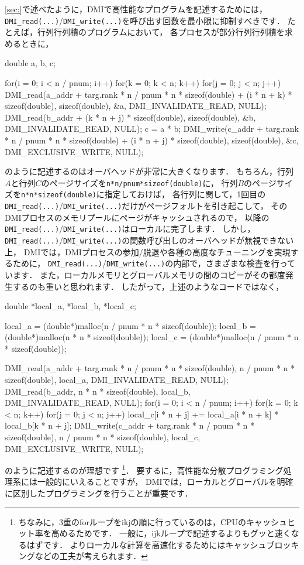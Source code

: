 \documentclass[report,12pt]{jsbook}
\begin{document}
\ref{sec:}で述べたように，DMIで高性能なプログラムを記述するためには，
\texttt{DMI\_read(...)}/\texttt{DMI\_write(...)}を呼び出す回数を最小限に抑制すべきです．
たとえば，行列行列積のプログラムにおいて，
各プロセスが部分行列行列積を求めるときに，
\begin{code}
double a, b, c;

for(i = 0; i < n / pnum; i++)
  {
    for(k = 0; k < n; k++) 
      {
        for(j = 0; j < n; j++)
          {
            DMI_read(a_addr + targ.rank * n / pnum * n * sizeof(double) + (i * n + k) * sizeof(double), sizeof(double), &a, DMI_INVALIDATE_READ, NULL);
            DMI_read(b_addr + (k * n + j) * sizeof(double), sizeof(double), &b, DMI_INVALIDATE_READ, NULL);
            c = a * b;
            DMI_write(c_addr + targ.rank * n / pnum * n * sizeof(double) + (i * n + j) * sizeof(double), sizeof(double), &c, DMI_EXCLUSIVE_WRITE, NULL);
          }
      }
  }
\end{code}
のように記述するのはオーバヘッドが非常に大きくなります．
もちろん，行列$A$と行列$C$のページサイズを\texttt{n*n/pnum*sizeof(double)}に，
行列$B$のページサイズを\texttt{n*n*sizeof(double)}に指定しておけば，
各行列に関して，1回目の\texttt{DMI\_read(...)}/\texttt{DMI\_write(...)}だけがページフォルトを引き起こして，
そのDMIプロセスのメモリプールにページがキャッシュされるので，
以降の\texttt{DMI\_read(...)}/\texttt{DMI\_write(...)}はローカルに完了します．
しかし，\texttt{DMI\_read(...)}/\texttt{DMI\_write(...)}の関数呼び出しのオーバヘッドが無視できない上，
DMIでは，DMIプロセスの参加/脱退や各種の高度なチューニングを実現するために，
\texttt{DMI\_read(...)}/\texttt{DMI\_write(...)}の内部で，さまざまな検査を行っています．
また，ローカルメモリとグローバルメモリの間のコピーがその都度発生するのも重いと思われます．
したがって，上述のようなコードではなく，
\begin{code}
double *local_a, *local_b, *local_c;

local_a = (double*)malloc(n / pnum * n * sizeof(double));
local_b = (double*)malloc(n * n * sizeof(double));
local_c = (double*)malloc(n / pnum * n * sizeof(double));

DMI_read(a_addr + targ.rank * n / pnum * n * sizeof(double), n / pnum * n * sizeof(double), local_a, DMI_INVALIDATE_READ, NULL);
DMI_read(b_addr, n * n * sizeof(double), local_b, DMI_INVALIDATE_READ, NULL);
for(i = 0; i < n / pnum; i++)
  {
    for(k = 0; k < n; k++) 
      {
        for(j = 0; j < n; j++)
          {
            local_c[i * n + j] += local_a[i * n + k] * local_b[k * n + j];
          }
      }
  }
DMI_write(c_addr + targ.rank * n / pnum * n * sizeof(double), n / pnum * n * sizeof(double), local_c, DMI_EXCLUSIVE_WRITE, NULL);
\end{code}
のように記述するのが理想です
\footnote{ちなみに，3重のforループをikjの順に行っているのは，CPUのキャッシュヒット率を高めるためです．
一般に，ijkループで記述するよりもグッと速くなるはずです．
よりローカルな計算を高速化するためにはキャッシュブロッキングなどの工夫が考えられます．}．
要するに，高性能な分散プログラミング処理系には一般的にいえることですが，
DMIでは，ローカルとグローバルを明確に区別したプログラミングを行うことが重要です．
\end{document}
